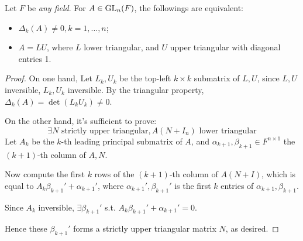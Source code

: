 \begin{lemma}[LU decomposition]
	Let $F$ be \textit{any field}. For $A\in \mathrm{GL}_n(F)$, the followings are equivalent:
	\begin{itemize}
		\item $\Delta_k(A) \ne 0, k = 1,\dots, n$;
		\item  $A = LU$, where $L$ lower triangular, and $U$ upper triangular
			with diagonal entries 1.
	\end{itemize}
\end{lemma}
\begin{proof}[Proof]
	On one hand,
    Let $L_k, U_k$ be the top-left $k\times k$ submatrix of $L, U$,
	since $L, U$ inversible, $L_k, U_k$ inversible.
	By the triangular property, $\Delta_k(A) = \det(L_kU_k)\ne 0$.

	On the other hand, it's sufficient to prove:
	\[
	\exists N\text{ strictly upper triangular}, A(N + I_n) \text{ lower triangular}
	\]
	Let $A_k$ be the $k$-th leading principal submatrix of $A$,
	and $\alpha_{k+1}, \beta_{k+1} \in F^{n\times 1}$ the $(k+1) $-th column of $A, N $.

	Now compute the first $k$ rows of the $(k+1)$-th column of  $A(N+I)$,
	which is equal to $A_k\beta_{k+1}' + \alpha_{k+1}'$,
	where $\alpha_{k+1}', \beta_{k+1}'$ is the first $k$ entries
	of $\alpha_{k+1}, \beta_{k+1}$.

	Since $A_k$ inversible, $\exists \beta_{k+1}'$ s.t.
	$A_k\beta_{k+1}' + \alpha_{k+1}' = 0$.

	Hence these $\beta_{k+1}'$ forms a strictly upper triangular matrix $N$,
	as desired.
\end{proof}
